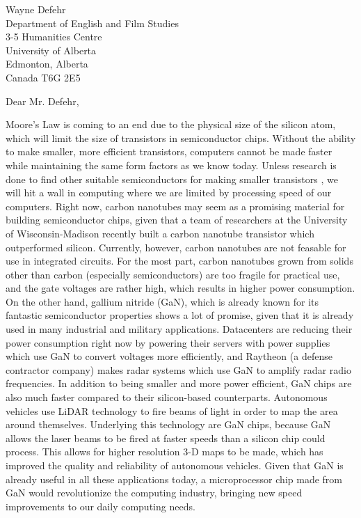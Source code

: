 \documentclass[letterpaper]{letter}
\begin{document}
\begin{letter}
{
Wayne Defehr\\
Department of English and Film Studies\\
3-5 Humanities Centre\\
University of Alberta\\
Edmonton, Alberta\\
Canada T6G 2E5\\
}

\opening{Dear Mr. Defehr,}
\doublespacing

Moore's Law is coming to an end due to the physical size of the silicon atom,
which will limit the size of transistors in semiconductor chips. Without the
ability to make smaller, more efficient transistors, computers cannot be made
faster while maintaining the same form factors as we know today. Unless research
is done to find other suitable semiconductors for making smaller transistors ,
we will hit a wall in computing where we are limited by processing speed of our
computers. Right now, carbon nanotubes may seem as a promising material for
building semiconductor chips, given that a team of researchers at the University
of Wisconsin-Madison recently built a carbon nanotube transistor which
outperformed silicon. Currently, however, carbon nanotubes are not feasable for
use in integrated circuits. For the most part, carbon nanotubes grown from
solids other than carbon (especially semiconductors) are too fragile for
practical use, and the gate voltages are rather high, which results in higher
power consumption. On the other hand, gallium nitride (GaN), which is already
known for its fantastic semiconductor properties shows a lot of promise, given
that it is already used in many industrial and military applications.
Datacenters are reducing their power consumption right now by powering their
servers with power supplies which use GaN to convert voltages more efficiently,
and Raytheon (a defense contractor company) makes radar systems which use GaN to
amplify radar radio frequencies. In addition to being smaller and more power
efficient, GaN chips are also much faster compared to their silicon-based
counterparts. Autonomous vehicles use LiDAR technology to fire beams of light in
order to map the area around themselves. Underlying this technology are GaN
chips, because GaN allows the laser beams to be fired at faster speeds than a
silicon chip could process. This allows for higher resolution 3-D maps to be
made, which has improved the quality and reliability of autonomous vehicles.
Given that GaN is already useful in all these applications today, a
microprocessor chip made from GaN would revolutionize the computing industry,
bringing new speed improvements to our daily computing needs.




\end{letter}
\end{document}
